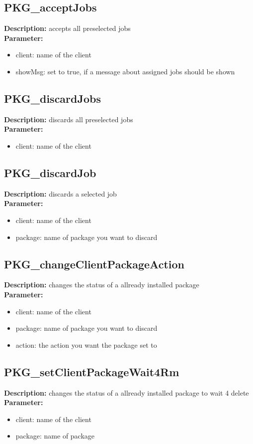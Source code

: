 \subsection{PKG\_acceptJobs}
\textbf{Description:} accepts all preselected jobs\\
\textbf{Parameter:}
\begin{itemize}
\item client: name of the client
\item showMsg: set to true, if a message about assigned jobs should be shown
\end{itemize}

\subsection{PKG\_discardJobs}
\textbf{Description:} discards all preselected jobs\\
\textbf{Parameter:}
\begin{itemize}
\item client: name of the client
\end{itemize}

\subsection{PKG\_discardJob}
\textbf{Description:} discards a selected job\\
\textbf{Parameter:}
\begin{itemize}
\item client: name of the client
\item package: name of package you want to discard
\end{itemize}

\subsection{PKG\_changeClientPackageAction}
\textbf{Description:} changes the status of a allready installed package\\
\textbf{Parameter:}
\begin{itemize}
\item client: name of the client
\item package: name of package you want to discard
\item action: the action you want the package set to
\end{itemize}

\subsection{PKG\_setClientPackageWait4Rm}
\textbf{Description:} changes the status of a allready installed package to wait 4 delete\\
\textbf{Parameter:}
\begin{itemize}
\item client: name of the client
\item package: name of package
\end{itemize}

